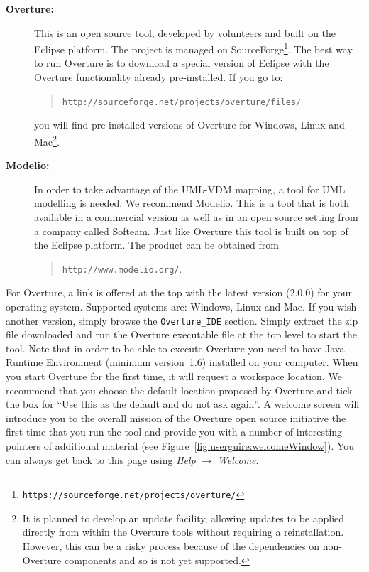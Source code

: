 \documentclass{overturerepchap}
\newcommand{\url}[1]{\texttt{#1}}
\begin{document}
\begin{description}
\item[\textbf{Overture:}] This
 is an open source tool, developed by volunteers and built on
the Eclipse platform. The project is managed on
SourceForge\footnote{\url{https://sourceforge.net/projects/overture/}}.
The best way to run Overture is to download a special version of
Eclipse with the Overture functionality already pre-installed. If you
go to:
  \begin{quote}
  \texttt{http://sourceforge.net/projects/overture/files/}
  \end{quote}
  \noindent you will find pre-installed versions of Overture for
  Windows, Linux and Mac\footnote{It is planned to develop an update
    facility, allowing updates to be applied directly from within the
    Overture tools without requiring a reinstallation. However, this
    can be a risky process because of the dependencies on non-Overture
    components and so is not yet supported.}.

  \item[\textbf{Modelio:}]   In order to take advantage of the UML-VDM mapping,
      a tool for UML modelling is needed. We recommend Modelio. This is a tool that
      is both available in a commercial version as well as in an open source
      setting from a company called Softeam. Just like Overture this tool is
      built on top of the Eclipse platform. The product can be obtained from
\begin{quote}
\texttt{http://www.modelio.org/}.
\end{quote}
\end{description}

For Overture, a link is offered at the top with the latest version (2.0.0) for
your operating system.  Supported systems are: Windows, Linux and Mac. If you
wish another version, simply browse the \texttt{Overture\_IDE} section.  Simply
extract the zip file downloaded and run the Overture executable
file at the top level to start the tool. Note that in order to be able
to execute Overture you need to have Java Runtime Environment (minimum
version~1.6) installed on your computer.
When you start Overture for the first time, it will request a workspace
location. We recommend that you choose the default location proposed
by Overture and tick the box for ``Use this as the default and do
not ask again''. A welcome screen will introduce you to the overall
mission of the Overture open source initiative the first time that you
run the tool and provide you with a number of interesting pointers of
additional material (see
Figure~\ref{fig:userguire:welcomeWindow}). You
can always get back to this page using \emph{Help} $ \rightarrow$
\emph{Welcome}.
\end{document}
